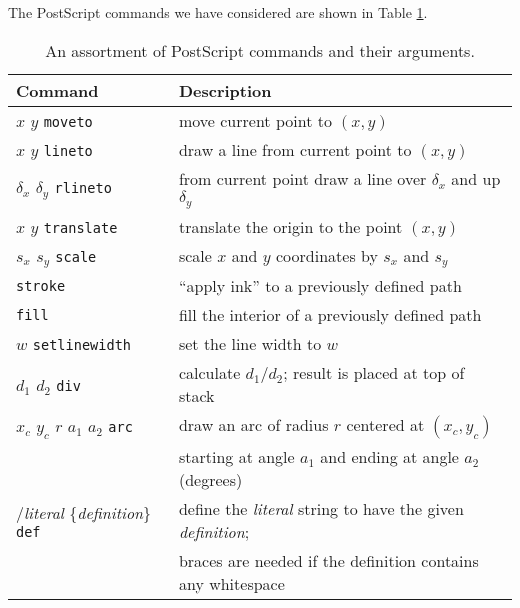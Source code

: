 The PostScript commands we have considered are shown in Table
\ref{tab:postscript}.
\begin{table}
\begin{tabular}{ll}
Command & Description \\ \hline
$x$ $y$ {\tt moveto} &  move current point to $(x,y)$ \\
$x$ $y$ {\tt lineto} & draw a line from current point to $(x,y)$ \\
$\delta_x$ $\delta_y$ {\tt rlineto}&
 from current point draw a line over $\delta_x$ and up $\delta_y$ \\
$x$ $y$ {\tt translate} & translate the origin to the point $(x,y)$ \\
$s_x$ $s_y$ {\tt scale} & scale $x$ and $y$ coordinates by $s_x$ and
  $s_y$ \\
{\tt stroke} & ``apply ink'' to a previously defined path\\
{\tt fill}   & fill the interior of a previously defined path\\
$w$ {\tt setlinewidth} & set the line width to $w$\\
$d_1$ $d_2$ {\tt div} & calculate $d_1/d_2$;
            result is placed at top of stack \\
$x_c$ $y_c$ $r$ $a_1$ $a_2$ {\tt arc} & draw an arc of radius $r$
centered at $(x_c,y_c)$ \\
  & starting at angle $a_1$ and ending at angle $a_2$ (degrees) \\
/{\em literal} \{{\em definition}\} {\tt def} & define the {\em
literal} string to have the given {\em definition}; \\
  & braces are needed if the definition contains any whitespace
\end{tabular}
\caption{An assortment of PostScript commands and their arguments.} \label{tab:postscript}
\end{table}

